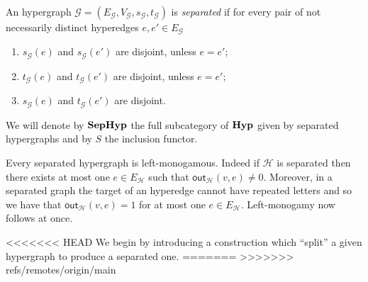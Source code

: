 \documentclass[3p]{elsarticle}
\newcommand{\outd}[1]{\mathsf{out}_{\mathcal{#1}}}
\newcommand{\catname}[1]{\textbf{\textup{#1}}}
\newcommand{\hyp}{\catname{Hyp}}
\newcommand{\shyp}{\catname{SepHyp}}
\theoremstyle{remark}
\theoremstyle{definition}
\begin{document}
\begin{defi}  An hypergraph $\mathcal{G}=(E_{\mathcal{G}}, V_{\mathcal{G}}, s_{\mathcal{G}}, t_{\mathcal{G}})$ is \emph{separated} if for every pair of not necessarily distinct hyperedges $e, e'\in E_{\mathcal{G}}$
	\begin{enumerate}
	\item $s_{\mathcal{G}}(e)$ and $s_{\mathcal{G}}(e')$ are disjoint, unless $e = e'$;
	\item $t_{\mathcal{G}}(e)$ and $t_{\mathcal{G}}(e')$ are disjoint, unless $e = e'$;	
	\item $s_{\mathcal{G}}(e)$ and $t_{\mathcal{G}}(e')$ are disjoint.
	\end{enumerate}
We will denote by $\shyp$ the full subcategory of $\hyp$ given by separated hypergraphs and by $S$ the inclusion functor.
\end{defi}

\begin{rem}
	Every separated hypergraph is left-monogamous. Indeed if $\mathcal{H}$ is separated then there exists at most one $e\in E_{\mathcal{H}}$ such that $\outd{H}(v, e) \neq 0$. Moreover, in a separated graph the target of an hyperedge cannot have repeated letters and so we have that  $\outd{H}(v, e) = 1$ for at most one $e\in E_{\mathcal{H}}$. Left-monogamy now follows at once.
\end{rem}

<<<<<<< HEAD
We begin by introducing a construction which ``split'' a given hypergraph to produce a separated one.
=======
>>>>>>> refs/remotes/origin/main
\end{document}
